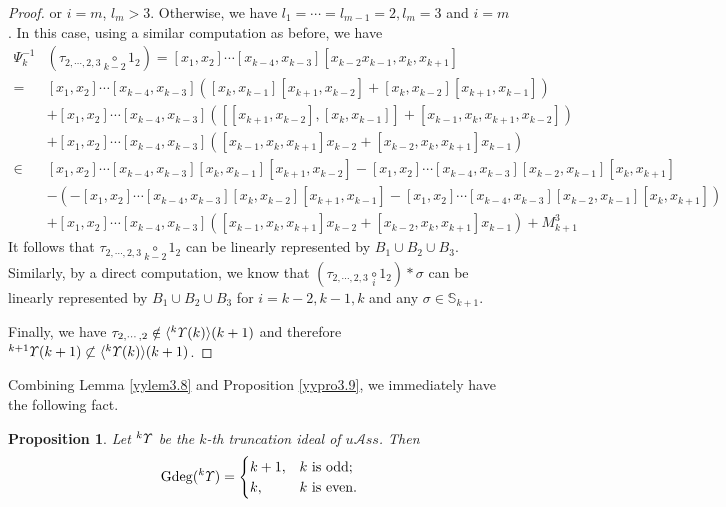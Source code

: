 \documentclass{amsart}
\newtheorem{prop}[thm]{Proposition}
\theoremstyle{definition}
\theoremstyle{remark}
\numberwithin{equation}{section}
\def\S{\mathbb{S}}
\def\gd{\operatorname{Gdeg}}
\newcommand{\lr}[1]{\langle #1 \rangle}
\newcommand{\ucr}[1]{\underset{#1}{\circ}}
\newcommand{\up}[1]{{^{#1}{\it \!\Upsilon}}}
\def \uas{u\mathcal{A}ss}
\def \S{\mathbb{S}}
\begin{document}
\begin{proof}
or $i=m$, $l_m>3$. Otherwise, we have $l_1=\cdots=l_{m-1}=2, 
l_m=3$ and $i=m$. In this case, using a similar computation
as before, we have 
\begin{align*}
\Psi_k^{-1}&(\tau_{2, \cdots, 2, 3}\ucr{k-2}1_2)=[x_1,x_2]
 \cdots[x_{k-4}, x_{k-3}][x_{k-2}x_{k-1}, x_k, x_{k+1}]\\
=& [x_1,x_2]\cdots[x_{k-4}, x_{k-3}]([x_k, x_{k-1}]
 [x_{k+1}, x_{k-2}]+[x_{k}, x_{k-2}][x_{k+1}, x_{k-1}])\\
&+ [x_1,x_2]\cdots[x_{k-4}, x_{k-3}]([[x_{k+1}, x_{k-2}],
 [x_k, x_{k-1}]]+[x_{k-1}, x_k, x_{k+1}, x_{k-2}])\\
&+[x_1,x_2]\cdots[x_{k-4}, x_{k-3}]([x_{k-1}, x_k, 
 x_{k+1}]x_{k-2}+[x_{k-2}, x_k, x_{k+1}]x_{k-1})\\
\in & [x_1,x_2]\cdots[x_{k-4}, x_{k-3}]
 [x_k, x_{k-1}][x_{k+1}, x_{k-2}]-[x_1,x_2]\cdots
 [x_{k-4}, x_{k-3}][x_{k-2}, x_{k-1}][x_{k}, x_{k+1}]\\
&-(-[x_1,x_2]\cdots[x_{k-4}, x_{k-3}][x_{k}, x_{k-2}]
 [x_{k+1}, x_{k-1}]-[x_1,x_2]\cdots[x_{k-4}, x_{k-3}]
 [x_{k-2}, x_{k-1}][x_{k}, x_{k+1}])\\
&+[x_1,x_2]\cdots[x_{k-4}, x_{k-3}]([x_{k-1}, x_k, 
	x_{k+1}]x_{k-2}+[x_{k-2}, x_k, x_{k+1}]x_{k-1})+M^3_{k+1}
\end{align*}
It follows that $\tau_{2, \cdots, 2, 3}\ucr{k-2}1_2$ can 
be linearly represented by $B_1\cup B_2 \cup B_3$. 
Similarly, by a direct computation, we know that
$(\tau_{2, \cdots, 2, 3}\ucr{i}1_2)\ast \sigma$ 
can be linearly represented by $B_1\cup B_2 \cup B_3$ for 
$i=k-2, k-1, k$ and any $\sigma\in \S_{k+1}$. 

Finally, we have 
$\tau_{2, \cdots, 2}\notin \lr{\up{k}(k)}(k+1)$ and therefore
$\up{k+1}(k+1)\not\subset\lr{\up{k}(k)}(k+1)$.
\end{proof}


Combining Lemma \ref{yylem3.8} and Proposition \ref{yypro3.9},
we immediately have the following fact. 

\begin{prop}
\label{yypro3.10}
Let $\up{k}$ be the $k$-th truncation ideal of $\uas$. 
Then 
\[\gd(\up{k})=\begin{cases}
k+1, & k\ \mbox{\rm is odd};\\
k, & k\ \mbox{\rm is even}.
\end{cases}\]
\end{prop}
%
\end{document}
